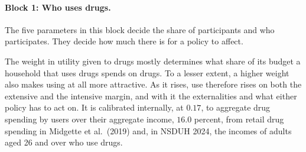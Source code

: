 \documentclass[10pt]{article}
\begin{document}
\paragraph{Block 1: Who uses drugs.}  The five parameters in this block decide the share of participants and who participates.  They decide how much there is for a policy to affect.
\begin{description}\setlength{\itemsep}{0.25em}\setlength{\parskip}{0em}
\item[$\theta$, the weight on drugs in utility.]
  The weight in utility given to drugs mostly determines what share of its budget a household that uses drugs spends on drugs. To a lesser extent, a higher weight also makes using at all more attractive. As it rises, use therefore rises on both the extensive and the intensive margin, and with it the externalities and what either policy has to act on. It is calibrated internally, at $0.17$, to aggregate drug spending by users over their aggregate income, $16.0$ percent, from retail drug spending in Midgette et al.\ (2019) and, in NSDUH 2024, the incomes of adults aged 26 and over who use drugs.


\end{description}
\end{document}
